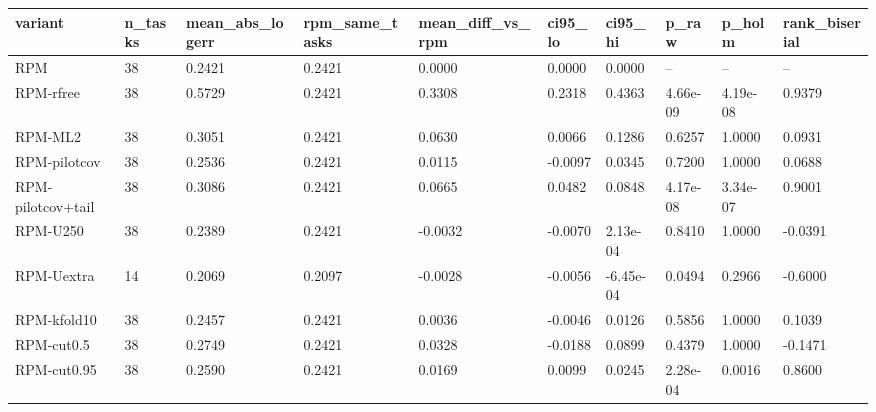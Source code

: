 \begin{tabular}{llllllllll}
\hline
variant & n\_tasks & mean\_abs\_logerr & rpm\_same\_tasks & mean\_diff\_vs\_rpm & ci95\_lo & ci95\_hi & p\_raw & p\_holm & rank\_biserial \\
\hline
RPM & 38 & 0.2421 & 0.2421 & 0.0000 & 0.0000 & 0.0000 & – & – & – \\
RPM-rfree & 38 & 0.5729 & 0.2421 & 0.3308 & 0.2318 & 0.4363 & 4.66e-09 & 4.19e-08 & 0.9379 \\
RPM-ML2 & 38 & 0.3051 & 0.2421 & 0.0630 & 0.0066 & 0.1286 & 0.6257 & 1.0000 & 0.0931 \\
RPM-pilotcov & 38 & 0.2536 & 0.2421 & 0.0115 & -0.0097 & 0.0345 & 0.7200 & 1.0000 & 0.0688 \\
RPM-pilotcov+tail & 38 & 0.3086 & 0.2421 & 0.0665 & 0.0482 & 0.0848 & 4.17e-08 & 3.34e-07 & 0.9001 \\
RPM-U250 & 38 & 0.2389 & 0.2421 & -0.0032 & -0.0070 & 2.13e-04 & 0.8410 & 1.0000 & -0.0391 \\
RPM-Uextra & 14 & 0.2069 & 0.2097 & -0.0028 & -0.0056 & -6.45e-04 & 0.0494 & 0.2966 & -0.6000 \\
RPM-kfold10 & 38 & 0.2457 & 0.2421 & 0.0036 & -0.0046 & 0.0126 & 0.5856 & 1.0000 & 0.1039 \\
RPM-cut0.5 & 38 & 0.2749 & 0.2421 & 0.0328 & -0.0188 & 0.0899 & 0.4379 & 1.0000 & -0.1471 \\
RPM-cut0.95 & 38 & 0.2590 & 0.2421 & 0.0169 & 0.0099 & 0.0245 & 2.28e-04 & 0.0016 & 0.8600 \\
\hline
\end{tabular}
